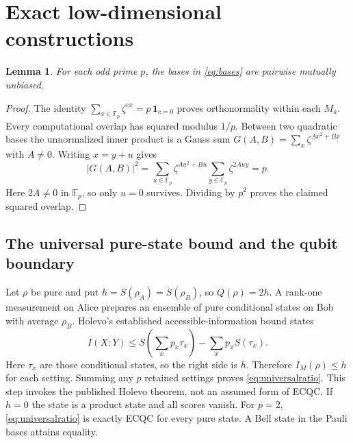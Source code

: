 \documentclass[11pt]{article}
\newtheorem{lemma}[theorem]{Lemma}
\theoremstyle{remark}
\newcommand{\F}{\mathbb F}
\begin{document}
\section{Exact low-dimensional constructions}
\begin{lemma}\label{lem:mub}
For each odd prime $p$, the bases in \eqref{eq:bases} are pairwise mutually unbiased.
\end{lemma}
\begin{proof}
The identity $\sum_{x\in\F_p}\zeta^{c x}=p\,\mathbf1_{c=0}$ proves orthonormality within each $M_a$. Every computational overlap has squared modulus $1/p$. Between two quadratic bases the unnormalized inner product is a Gauss sum
$G(A,B)=\sum_x\zeta^{A x^2+B x}$ with $A\ne0$. Writing $x=y+u$ gives
\[
 |G(A,B)|^2
 =\sum_{u\in\F_p}\zeta^{A u^2+B u}
   \sum_{y\in\F_p}\zeta^{2Auy}=p.
\]
Here $2A\ne0$ in $\F_p$, so only $u=0$ survives. Dividing by $p^2$ proves the claimed squared overlap.
\end{proof}


\subsection{The universal pure-state bound and the qubit boundary}
Let $\rho$ be pure and put $h=S(\rho_A)=S(\rho_B)$, so $Q(\rho)=2h$. A rank-one measurement on Alice prepares an ensemble of pure conditional states on Bob with average $\rho_B$. Holevo's established accessible-information bound \cite{holevo} states
\[
 I(X:Y)\leq S\!\left(\sum_xp_x\tau_x\right)-\sum_xp_x S(\tau_x).
\]
Here $\tau_x$ are those conditional states, so the right side is $h$. Therefore $I_M(\rho)\leq h$ for each setting. Summing any $p$ retained settings proves \eqref{eq:universalratio}. This step invokes the published Holevo theorem, not an assumed form of ECQC. If $h=0$ the state is a product state and all scores vanish. For $p=2$, \eqref{eq:universalratio} is exactly ECQC for every pure state. A Bell state in the Pauli bases attains equality.
\end{document}
